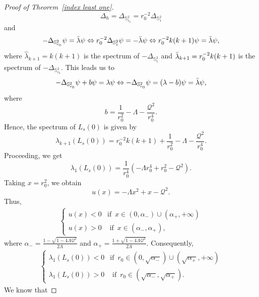 \documentclass[a4paper, 11pt, reqno]{amsart}
\begin{document}
\begin{proof}[Proof of Theorem~\ref{index least one}]
 \begin{equation*}
   \Delta_h=  \Delta_{\mathbb{S}^2_{r_0}}=r_0^{-2}\Delta_{\mathbb{S}^2_1}
 \end{equation*}
 and
 \begin{eqnarray*}
     -\Delta_{\mathbb{S}^2_{r_0}}\psi=\Bar{\lambda}\psi
     \Leftrightarrow r_0^{-2}\Delta_{\mathbb{S}_1^2}\psi
     =-\Bar{\lambda}\psi\Leftrightarrow r_0^{-2}k(k+1)\psi=\Bar{\lambda}\psi,
 \end{eqnarray*}
 where $\hat{\lambda}_{k+1}=k(k+1)$ is the spectrum of $-\Delta_{\mathbb{S}_1^2}$ and $\Bar{\lambda}_{k+1}=r_0^{-2}k(k+1)$ is the spectrum of $-\Delta_{\mathbb{S}^2_{r_0}}$. This leads us to
 \begin{eqnarray*}
     -\Delta_{\mathbb{S}^2_{r_0}}\psi+b\psi=\lambda\psi\Leftrightarrow -\Delta_{\mathbb{S}^2_{r_0}}\psi=(\lambda-b)\psi=\Bar{\lambda}\psi,
 \end{eqnarray*}
 where
 $$b=\frac{1}{r_0^2}-\Lambda-\frac{\mathcal{Q}^2}{r_0^4}.$$
 Hence, the spectrum of $L_s(0)$ is given by
 \begin{equation}\label{spectrum of L_s RNdS}
     \lambda_{k+1}(L_s(0))=r_0^{-2}k(k+1)+\frac{1}{r_0^2}-\Lambda-\frac{\mathcal{Q}^2}{r_0^4}.
 \end{equation}
 Proceeding, we get
 \begin{equation*}
\lambda_1(L_s(0))=\frac{1}{r_0^4}(-\Lambda r_0^4+r_0^2-\mathcal{Q}^2).
 \end{equation*}
 Taking $x=r_0^2$, we obtain
 $$u(x)=-\Lambda x^2+x-\mathcal{Q}^2.$$
 Thus,
 \begin{eqnarray*}
\left\{\begin{array}{rc}
u(x)<0 &\mbox{if}\,\,\,x\in (0,\alpha_{-})\cup(\alpha_{+},+\infty)\\
u(x)>0  &\mbox{ if}\,\,\,x\in (\alpha_{-},\alpha_{+}),
\end{array}\right.
\end{eqnarray*}
where $\alpha_{-}=\frac{1-\sqrt{1-4\Lambda\mathcal{Q}^2}}{2\Lambda}$ and $\alpha_{+}=\frac{1+\sqrt{1-4\Lambda\mathcal{Q}^2}}{2\Lambda}$.
Consequently,
 \begin{eqnarray*}
\left\{\begin{array}{rc}
\lambda_1(L_s(0))<0 &\mbox{if}\,\,\,r_0\in (0,\sqrt{\alpha_{-}})\cup(\sqrt{\alpha_{+}},+\infty)\\
\lambda_{1}(L_s(0))>0  &\mbox{ if}\,\,\,r_0\in (\sqrt{\alpha_{-}},\sqrt{\alpha_{+}}).
\end{array}\right.
\end{eqnarray*}
We know that

\end{proof}
\end{document}
